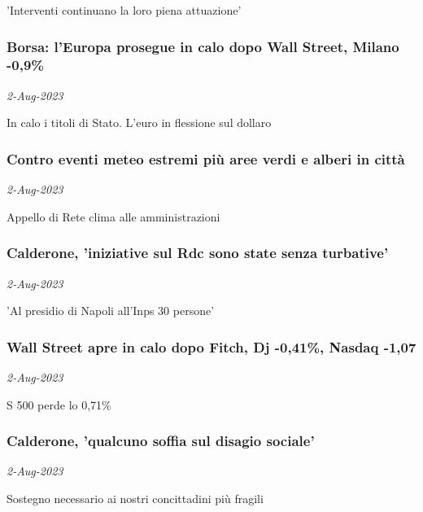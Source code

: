 'Interventi continuano la loro piena attuazione'
\subsubsection{Borsa: l'Europa prosegue in calo dopo Wall Street, Milano -0,9\% \href{https://www.ansa.it/sito/notizie/economia/2023/08/02/borsa-leuropa-prosegue-in-calo-dopo-wall-street-milano-09_f75a275e-f12b-48a0-8be8-239c78236a5a.html}{}}
\textit{2-Aug-2023}

In calo i titoli di Stato. L'euro in flessione sul dollaro
\subsubsection{Contro eventi meteo estremi pi\`{u} aree verdi e alberi in citt\`{a} \href{https://www.ansa.it/sito/notizie/economia/2023/08/02/contro-eventi-meteo-estremi-piu-aree-verdi-e-alberi-in-citta_64ba018f-15e7-4f95-8f30-0f31969966f3.html}{}}
\textit{2-Aug-2023}

Appello di Rete clima alle amministrazioni
\subsubsection{Calderone, 'iniziative sul Rdc sono state senza turbative' \href{https://www.ansa.it/sito/notizie/economia/2023/08/02/calderone-iniziative-sul-rdc-sono-state-senza-turbative_0fb5c21d-01f5-410a-9401-cc9e8461eb35.html}{}}
\textit{2-Aug-2023}

'Al presidio di Napoli all'Inps 30 persone'
\subsubsection{Wall Street apre in calo dopo Fitch, Dj -0,41\%, Nasdaq -1,07 \href{https://www.ansa.it/sito/notizie/economia/2023/08/02/wall-street-apre-in-calo-dopo-fitch-dj-041-nasdaq-107_d51f5198-b427-4d3a-bed6-3b74981377c1.html}{}}
\textit{2-Aug-2023}

S 500 perde lo 0,71\%
\subsubsection{Calderone, 'qualcuno soffia sul disagio sociale' \href{https://www.ansa.it/sito/notizie/economia/2023/08/02/calderone-qualcuno-soffia-sul-disagio-sociale_06d904e7-8e37-43fe-a631-f1a499601e75.html}{}}
\textit{2-Aug-2023}

Sostegno necessario ai nostri concittadini pi\`{u} fragili
